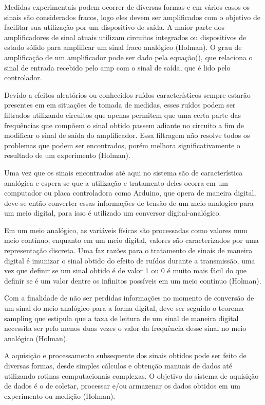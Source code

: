 Medidas experimentais podem ocorrer de diversas formas e em vários casos os sinais são considerados fracos, logo eles devem ser amplificados com o objetivo de facilitar sua utilização por um dispositivo de saída. A maior parte dos amplificadores de sinal atuais utilizam circuitos integrados ou dispositivos de estado sólido para amplificar um sinal fraco analógico (Holman). O grau de amplificação de um amplificador pode ser dado pela equação(), que relaciona o sinal de entrada recebido pelo amp com o sinal de saída, que é lido pelo controlador.

Devido a efeitos aleatórios ou conhecidos ruídos característicos sempre estarão presentes em em situações de tomada de medidas, esses ruídos podem ser filtrados utilizando circuitos que apenas permitem que uma certa parte das frequências que compõem o sinal obtido passem adiante no circuito a fim de modificar o sinal de saída do amplificador. Essa filtragem não resolve todos os problemas que podem ser encontrados, porém melhora significativamente o resultado de um experimento (Holman).

Uma vez que os sinais encontrados até aqui no sistema são de característica analógica e espera-se que a utilização e tratamento deles ocorra em um computador ou placa controladora como Arduino, que opera de maneira digital, deve-se então converter essas informações de tensão de um meio analogico para um meio digital, para isso é utilizado um conversor digital-analógico.

Em um meio analógico, as variáveis físicas são processadas como valores num meio contínuo, enquanto em um meio digital, valores são caracterizados por uma representação discreta. Uma faz razões para o tratamento de sinais de maneira digital é imunizar o sinal obtido do efeito de ruídos durante a transmissão, uma vez que definir se um sinal obtido é de valor 1 ou 0 é muito mais fácil do que definir se é um valor dentre os infinitos possíveis em um meio contínuo (Holman).

Com a finalidade de não ser perdidas informações no momento de conversão de um sinal do meio analógico para a forma digital, deve ser seguido o teorema sampling que estipula que a taxa de leitura de um sinal de maneira digital necessita ser pelo menos duas vezes o valor da frequência desse sinal no meio analógico (Holman).

A aquisição e processamento subsequente dos sinais obtidos pode ser feito de diversas formas, desde simples cálculos e obtenção manuais de dados até utilizando  rotinas computacionais complexas. O objetivo do sistema de aquisição de dados é o de coletar, processar e/ou armazenar os dados obtidos em um experimento ou medição (Holman).

